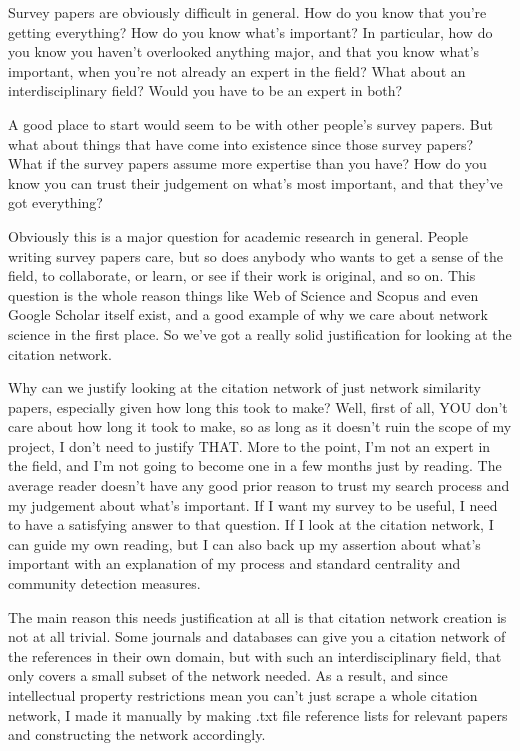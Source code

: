 \documentclass[12pt]{thesis}
\theoremstyle{plain}
\theoremstyle{definition}
\theoremstyle{remark}
\begin{document}
Survey papers are obviously difficult in general. How do you know that you're getting everything? How do you know what's important? In particular, how do you know you haven't overlooked anything major, and that you know what's important, when you're not already an expert in the field? What about an interdisciplinary field? Would you have to be an expert in both?

A good place to start would seem to be with other people's survey papers. But what about things that have come into existence since those survey papers? What if the survey papers assume more expertise than you have? How do you know you can trust their judgement on what's most important, and that they've got everything?

Obviously this is a major question for academic research in general. People writing survey papers care, but so does anybody who wants to get a sense of the field, to collaborate, or learn, or see if their work is original, and so on. This question is the whole reason things like Web of Science and Scopus and even Google Scholar itself exist, and a good example of why we care about network science in the first place. So we've got a really solid justification for looking at the citation network.

Why can we justify looking at the citation network of just network similarity papers, especially given how long this took to make? Well, first of all, YOU don't care about how long it took to make, so as long as it doesn't ruin the scope of my project, I don't need to justify THAT. More to the point, I'm not an expert in the field, and I'm not going to become one in a few months just by reading. The average reader doesn't have any good prior reason to trust my search process and my judgement about what's important. If I want my survey to be useful, I need to have a satisfying answer to that question. If I look at the citation network, I can guide my own reading, but I can also back up my assertion about what's important with an explanation of my process and standard centrality and community detection measures.

The main reason this needs justification at all is that citation network creation is not at all trivial. Some journals and databases can give you a citation network of the references in their own domain, but with such an interdisciplinary field, that only covers a small subset of the network needed. As a result, and since intellectual property restrictions mean you can't just scrape a whole citation network, I made it manually by making .txt file reference lists for relevant papers and constructing the network accordingly.
\end{document}

